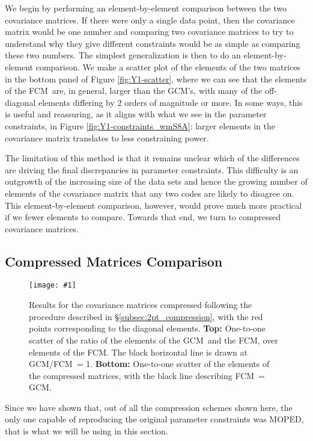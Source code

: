 \documentclass[twocolumn,nofootinbib]{\docclass}
\newcommand{\sfig}[2]{
	\texttt{[image: \#1]}
}
\newcommand{\rf}[1]{Figure \ref{fig:#1}}
\newcommand{\rssec}[1]{\S\ref{subsec:#1}}
\newcommand\full{the FCM}
\newcommand\gaussian{the GCM}
\begin{document}
We begin by performing an element-by-element comparison between the two covariance matrices. If there were only a single data point, then the covariance matrix would be one number and comparing two covariance matrices to try to understand why they give different constraints would be as simple as comparing these two numbers.  The simplest generalization is then to do an element-by-element comparison. We make a scatter plot of the elements of the two matrices in the bottom panel of \rf{Y1-scatter}, where we can see that the elements of \full\ are, in general, larger than \gaussian's, with many of the off-diagonal elements differing by 2 orders of magnitude or more. In some ways, this is useful and reassuring, as it aligns with what we see in the parameter constraints, in \rf{Y1-constraints_wmS8A}: larger elements in the covariance matrix translates to less constraining power. 

The limitation of this method is that it remains unclear which of the differences are driving the final discrepancies in parameter constraints. This difficulty is an outgrowth of the increasing size of the data sets and hence the growing number of elements of the covariance matrix that any two codes are likely to disagree on. This element-by-element comparison, however, would prove much more practical if we fewer elements to compare. Towards that end, we turn to compressed covariance matrices.

\subsection{Compressed Matrices Comparison}
\label{subsec:compare_compressed}

\begin{figure}[thbp]
	\sfig{Comp2pt-scatter}{0.85\columnwidth}
	\caption{ Results for the covariance matrices compressed following the procedure described in \rssec{2pt_compression}, with the red points corresponding to the diagonal elements.
		\textbf{Top:}  One-to-one scatter of the ratio of the elements of \gaussian\ and \full, over elements of \full. The black horizontal line is drawn at GCM/FCM\ = 1.
		\textbf{Bottom:}  One-to-one scatter of the elements of the compressed matrices, with the black line describing FCM\ = GCM.}
	\label{fig:Comp2pt-scatter}
\end{figure}

Since we have shown that, out of all the compression schemes shown here, the only one capable of reproducing the original parameter constraints was MOPED, that is what we will be using in this section.
\end{document}
